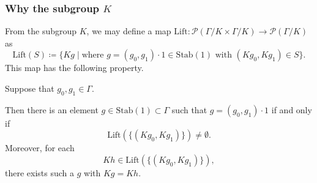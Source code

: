 \documentclass[aspectratio=169,10pt]{beamer}
\newcommand\PowerSet[1]{{\mathcal{P}(#1)}}
\newcommand\Grig{{\Gamma}}
\newcommand\SubK{{K}}
\begin{document}
\begin{frame}
	\frametitle{Why the subgroup $\SubK$}

	\begin{definition}
		From the subgroup $K$, we may define a map
		$\mathrm{Lift}\colon \PowerSet{\Grig/\SubK \times \Grig/\SubK}\to \PowerSet{\Grig/\SubK}$
		as
		\[
			\mathrm{Lift}(S)
			\coloneq
			\{
			Kg \mid
			\text{where }g=(g_0,g_1)\cdot 1\in\mathrm{Stab}(1)
			\text{ with }(Kg_0,Kg_1)\in S
			\}.
		\]
		This map has the following property.
	\end{definition}

	Suppose that $g_0,g_1\in \Gamma$.

	Then there is an element $g\in \mathrm{Stab}(1)\subset \Gamma$
	such that $g = (g_0,g_1)\cdot 1$ if and only if
	\[
		\mathrm{Lift}(\{(Kg_0,Kg_1)\}) \neq \emptyset.
	\]
	Moreover, for each
	\[
		Kh \in
		\mathrm{Lift}(\{(Kg_0,Kg_1)\}),
	\]
	there exists such a $g$ with $Kg = Kh$.

\end{frame}

\end{document}
